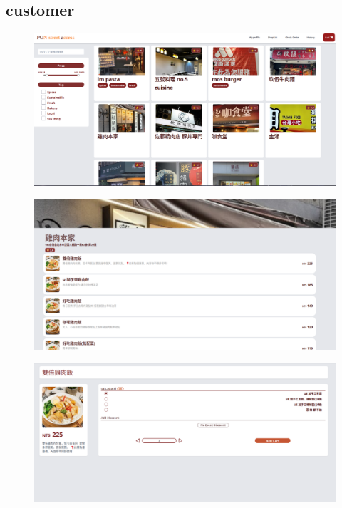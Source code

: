\documentclass[a4paper, 12pt]{article}
\begin{document}
\subsection{customer}
\begin{figure}[hp]
    \centerline{\includegraphics[width=40em]{gui-snapshot/customer/shoplist.png}}
    \label{fig:enter-label}
\end{figure}
\newline
{}
\begin{figure}[hp]
    \centerline{\includegraphics[width=40em]{gui-snapshot/customer/shop.png}}
    \label{fig:enter-label}
\end{figure}
\newline
\newpage
{}
\begin{figure}[hp]
    \centerline{\includegraphics[width=40em]{gui-snapshot/customer/item.png}}
    \label{fig:enter-label}
\end{figure}
\end{document}
